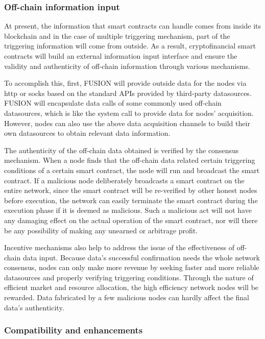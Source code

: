\documentclass[a4paper,12pt]{article}
\begin{document}
\subsubsection{Off-chain information input}

At present, the information that smart contracts can handle comes from inside its blockchain and in the case of multiple triggering mechanism, part of the triggering information will come from outside. As a result, cryptofinancial smart contracts will build an external information input interface and ensure the validity and authenticity of off-chain information through various mechanisms.

To accomplish this, first, FUSION will provide outside data for the nodes via http or socks based on the standard APIs provided by third-party datasources. FUSION will encapsulate data calls of some commonly used off-chain datasources, which is like the system call to provide data for nodes' acquisition. However, nodes can also use the above data acquisition channels to build their own datasources to obtain relevant data information.

The authenticity of the off-chain data obtained is verified by the consensus mechanism. When a node finds that the off-chain data related certain triggering conditions of a certain smart contract, the node will run and broadcast the smart contract. If a malicious node deliberately broadcasts a smart contract on the entire network, since the smart contract will be re-verified by other honest nodes before execution, the network can easily terminate the smart contract during the execution phase if it is deemed as malicious. Such a malicious act will not have any damaging effect on the actual operation of the smart contract, nor will there be any possibility of making any unearned or arbitrage profit.

Incentive mechanisms also help to address the issue of the effectiveness of off-chain data input. Because data's successful confirmation needs the whole network consensus, nodes can only make more revenue by seeking faster and more reliable datasources and properly verifying triggering conditions. Through the nature of efficient market and resource allocation, the high efficiency network nodes will be rewarded. Data fabricated by a few malicious nodes can hardly affect the final data's authenticity.


\subsubsection{Compatibility and enhancements}
\end{document}
